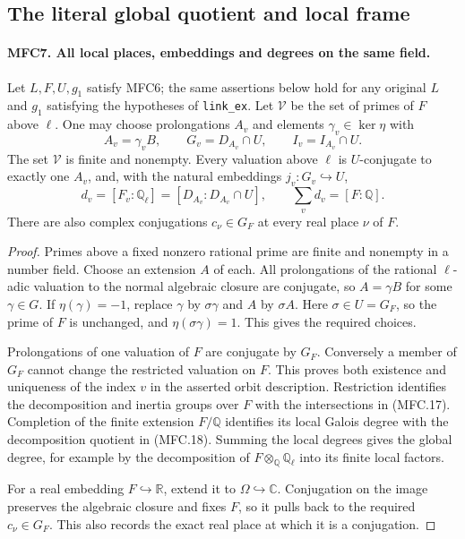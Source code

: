 \subsection{The literal global quotient and local frame}

\paragraph{MFC7. All local places, embeddings and degrees on the same field.}
\label{claim:MFC7}
Let \(L,F,U,g_1\) satisfy MFC6; the same assertions below hold
for any original \(L\) and \(g_1\) satisfying the hypotheses
of \texttt{link\_ex}.  Let \(\mathcal V\) be the set of primes
of \(F\) above \(\ell\).  One may choose prolongations
\(A_v\) and elements \(\gamma_v\in\ker\eta\) with
\[
 A_v=\gamma_v B,\qquad
 G_v=D_{A_v}\cap U,\qquad I_v=I_{A_v}\cap U.              \tag{MFC.17}
\]
The set \(\mathcal V\) is finite and nonempty.  Every valuation
above \(\ell\) is \(U\)-conjugate to exactly one \(A_v\),
and, with the natural embeddings \(j_v:G_v\hookrightarrow U\),
\[
 d_v=[F_v:\mathbb Q_\ell]=[D_{A_v}:D_{A_v}\cap U],
 \qquad \sum_vd_v=[F:\mathbb Q].                           \tag{MFC.18}
\]
There are also complex conjugations \(c_\nu\in G_F\) at
every real place \(\nu\) of \(F\).

\begin{proof}
Primes above a fixed nonzero rational prime are finite and nonempty
in a number field.  Choose an extension \(A\) of each.  All
prolongations of the rational \(\ell\)-adic valuation to the
normal algebraic closure are conjugate, so \(A=\gamma B\)
for some \(\gamma\in G\).  If \(\eta(\gamma)=-1\), replace
\(\gamma\) by \(\sigma\gamma\) and \(A\) by \(\sigma A\).
Here \(\sigma\in U=G_F\), so the prime of \(F\) is unchanged,
and \(\eta(\sigma\gamma)=1\).  This gives the required choices.

Prolongations of one valuation of \(F\) are conjugate by \(G_F\).
Conversely a member of \(G_F\) cannot change the restricted
valuation on \(F\).  This proves both existence and uniqueness
of the index \(v\) in the asserted orbit description.  Restriction
identifies the decomposition and inertia groups over \(F\) with
the intersections in (MFC.17).  Completion of the finite extension
\(F/\mathbb Q\) identifies its local Galois degree with the
decomposition quotient in (MFC.18).  Summing the local degrees
gives the global degree, for example by the decomposition of
\(F\otimes_\mathbb Q\mathbb Q_\ell\) into its finite local
factors.

For a real embedding \(F\hookrightarrow\mathbb R\), extend
it to \(\Omega\hookrightarrow\mathbb C\).  Conjugation on
the image preserves the algebraic closure and fixes \(F\),
so it pulls back to the required \(c_\nu\in G_F\).  This
also records the exact real place at which it is a conjugation.
\end{proof}

